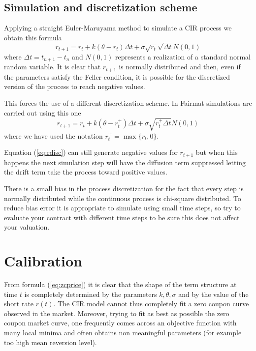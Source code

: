 \subsection{Simulation and discretization scheme}

Applying a straight Euler-Maruyama method to simulate a CIR process we obtain this formula
\begin{equation}
r_{t+1} = r_t + k(\theta - r_t)\Delta t + \sigma\sqrt{r_t}\sqrt{\Delta t} N(0,1)
\end{equation}
where $\Delta t = t_{n+1}-t_n$ and $N(0,1)$ represents a realization of a standard normal random variable. It is clear that $r_{t+1}$ is normally distributed and then, even if the parameters satisfy the Feller condition, it is possible for the discretized version of the process to reach negative values.

This forces the use of a different discretization scheme. In Fairmat simulations are carried out using this one
\begin{equation}
r_{t+1} = r_t + k\left(\theta - r_t^+\right)\Delta t + \sigma\sqrt{r_t^+\Delta t} N(0,1)\label{eq:rdisc}
\end{equation}
where we have used the notation $r_t^+=\max\{r_t,0\}$.

Equation (\ref{eq:rdisc}) can still generate negative values for $r_{t+1}$ but when this happens the next simulation step will have the diffusion term suppressed letting the drift term take the process toward positive values.

There is a small bias in the process discretization for the fact that every step is normally distributed while the continuous process is chi-square distributed. To reduce bias error it is appropriate to simulate using small time steps, so try to evaluate your contract with different time steps to be sure this does not affect your valuation.

\section{Calibration}

From formula (\ref{eq:zcprice}) it is clear that the shape of the term structure at time $t$ is completely determined by the parameters $k, \theta, \sigma$ and by the value of the short rate $r(t)$. The CIR model cannot thus completely fit a zero coupon curve observed in the market. Moreover, trying to fit as best as possible the zero coupon market curve, one frequently comes across an objective function with many local minima and often obtains non meaningful parameters (for example too high mean reversion level).

